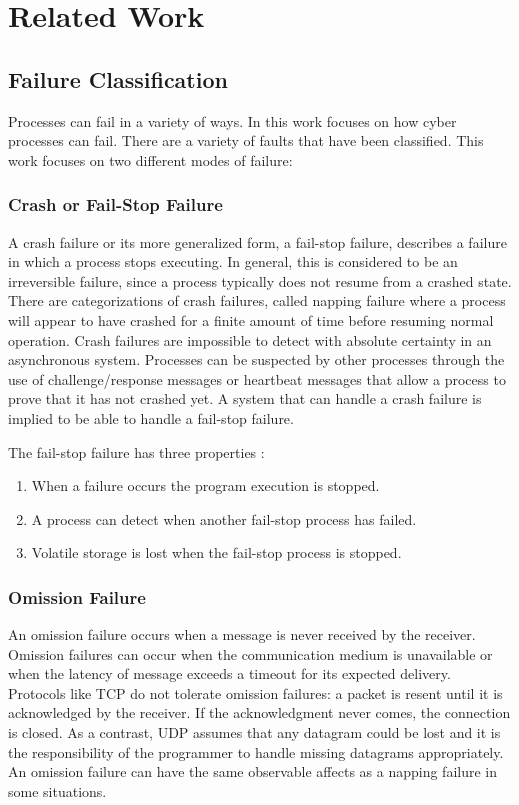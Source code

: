 \chapter{Related Work}

\section{Failure Classification}

Processes can fail in a variety of ways. In this work focuses on how cyber processes can fail. There are a variety of faults that have been classified. This work focuses on two different modes of failure:

\subsection{Crash or Fail-Stop Failure}

A crash failure or its more generalized form, a fail-stop failure, describes a failure in which a process stops executing.
In general, this is considered to be an irreversible failure, since a process typically does not resume from a crashed state.
There are categorizations of crash failures, called napping failure where a process will appear to have crashed for a finite amount of time before resuming normal operation.
Crash failures are impossible to detect with absolute certainty in an asynchronous system.
Processes can be suspected by other processes through the use of challenge/response messages or heartbeat messages that allow a process to prove that it has not crashed yet.
A system that can handle a crash failure is implied to be able to handle a fail-stop failure.\cite{DISTRIBUTED}

The fail-stop failure has three properties \cite{DISTRIBUTED}:

\begin{enumerate}
\item When a failure occurs the program execution is stopped.
\item A process can detect when another fail-stop process has failed.
\item Volatile storage is lost when the fail-stop process is stopped.
\end{enumerate}

\subsection{Omission Failure}

An omission failure occurs when a message is never received by the receiver.
Omission failures can occur when the communication medium is unavailable or when the latency of message exceeds a timeout for its expected delivery.
Protocols like TCP do not tolerate omission failures: a packet is resent until it is acknowledged by the receiver.
If the acknowledgment never comes, the connection is closed.
As a contrast, UDP assumes that any datagram could be lost and it is the responsibility of the programmer to handle missing datagrams appropriately.
An omission failure can have the same observable affects as a napping failure in some situations. \cite{DISTRIBUTED}

